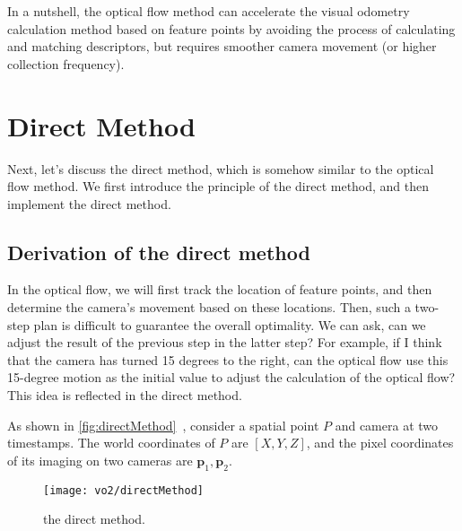 {In a nutshell, the optical flow method can accelerate the visual odometry calculation method based on feature points by avoiding the process of calculating and matching descriptors, but requires smoother camera movement (or higher collection frequency).

\section{Direct Method}
Next, let's discuss the direct method, which is somehow similar to the optical flow method. We first introduce the principle of the direct method, and then implement the direct method.

\subsection{Derivation of the direct method}
In the optical flow, we will first track the location of feature points, and then determine the camera's movement based on these locations. Then, such a two-step plan is difficult to guarantee the overall optimality. We can ask, can we adjust the result of the previous step in the latter step? For example, if I think that the camera has turned 15 degrees to the right, can the optical flow use this 15-degree motion as the initial value to adjust the calculation of the optical flow? This idea is reflected in the direct method.

As shown in \autoref{fig:directMethod}~, consider a spatial point $P$ and camera at two timestamps. The world coordinates of $P$ are $[X,Y,Z]$, and the pixel coordinates of its imaging on two cameras are $\bm{p}_1, \bm{p}_2$.

\begin{figure}[!htp]
	\centering
	\texttt{[image: vo2/directMethod]}
	\caption{the direct method.}
	\label{fig:directMethod}
\end{figure}

}
